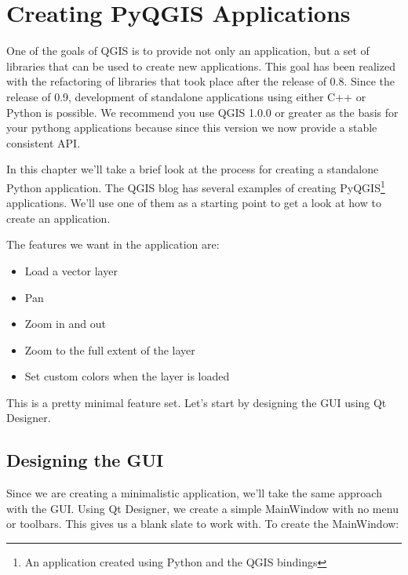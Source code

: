 
\section{Creating PyQGIS Applications}


One of the goals of QGIS is to provide not only an application, but a set of
libraries that can be used to create new applications. This goal has been
realized with the refactoring of libraries that took place after the release
of 0.8. Since the release of 0.9, development of standalone applications using
either C++ or Python is possible. We recommend you use QGIS 1.0.0 or greater
as the basis for your pythong applications because since this version we now
provide a stable consistent API.

In this chapter we'll take a brief look at the process for creating a
standalone Python application. The QGIS blog has several examples of creating
PyQGIS\footnote{An application created using Python and the QGIS bindings}
applications. We'll use one of them as a starting point to get a look at how
to create an application.

The features we want in the application are:

\begin{itemize}
\item Load a vector layer
\item Pan
\item Zoom in and out
\item Zoom to the full extent of the layer
\item Set custom colors when the layer is loaded
\end{itemize} 

This is a pretty minimal feature set. Let's start by designing the GUI using
Qt Designer. 

\subsection{Designing the GUI}

Since we are creating a minimalistic application, we'll take the same
approach with the GUI. Using Qt Designer, we create a simple MainWindow with
no menu or toolbars. This gives us a blank slate to work with. To create the
MainWindow:

